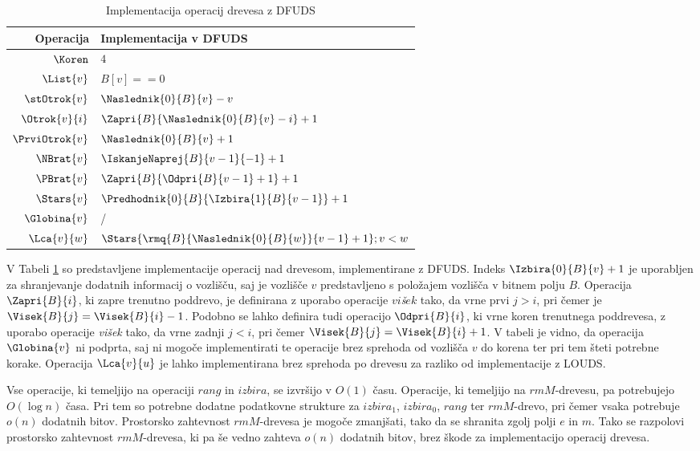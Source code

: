 \begin{table}[htb]
    \centering
    \caption{Implementacija operacij drevesa z DFUDS}
    \begin{tabular}{r|l}
\textbf{Operacija}& \textbf{Implementacija v DFUDS} \\\hline
         $\Koren$ &          $4$\\
         $\List{v}$ &        $B[v]==0$\\
         $\stOtrok{v}$&      $\Naslednik{0}{B}{v}-v$\\
         $\Otrok{v}{i}$ &    $\Zapri{B}{\Naslednik{0}{B}{v} - i}+1$\\
         $\PrviOtrok{v}$&     $\Naslednik{0}{B}{v}+1$\\
         $\NBrat{v}$ &       $\IskanjeNaprej{B}{v-1}{-1}+1$ \\
         $\PBrat{v}$ &       $\Zapri{B}{\Odpri{B}{v-1}+1}+1$ \\
         $\Stars{v}$ &        $\Predhodnik{0}{B}{\Izbira{1}{B}{v-1}}+1$ \\
         $\Globina{v}$ &         / \\
         $\Lca{v}{w}$ &      $\Stars{\rmq{B}{\Naslednik{0}{B}{w}}{v-1}+1};v<w$\\

    \end{tabular}
    \label{tab:DFUDSop}
\end{table}

V Tabeli \ref{tab:DFUDSop} so predstavljene implementacije operacij nad drevesom, implementirane z DFUDS. Indeks $\Izbira{0}{B}{v}+1$ je uporabljen za shranjevanje dodatnih informacij o vozlišču, saj je vozlišče $v$ predstavljeno s položajem vozlišča v bitnem polju $B$. Operacija $\Zapri{B}{i}$, ki zapre trenutno poddrevo, je definirana z uporabo operacije $vi$\textit{š}$ek$ tako, da vrne prvi $j>i$, pri čemer je $\Visek{B}{j}=\Visek{B}{i}-1$. Podobno se lahko definira tudi operacijo $\Odpri{B}{i}$, ki vrne koren trenutnega poddrevesa, z uporabo operacije \textit{višek} tako, da vrne zadnji $j<i$, pri čemer $\Visek{B}{j}=\Visek{B}{i}+1$. V tabeli je vidno, da operacija $\Globina{v}$ ni podprta, saj ni mogoče implementirati te operacije brez sprehoda od vozlišča $v$ do korena ter pri tem šteti potrebne korake. Operacija $\Lca{v}{u}$ je lahko implementirana brez sprehoda po drevesu za razliko od implementacije z LOUDS.

Vse operacije, ki temeljijo na operaciji $rang$ in $izbira$, se izvršijo v $O(1)$ času. Operacije, ki temeljijo na $rmM$-drevesu, pa potrebujejo $O(\log{n})$ časa. Pri tem so potrebne dodatne podatkovne strukture za $izbira_1$, $izbira_0$, $rang$ ter $rmM$-drevo, pri čemer vsaka potrebuje $o(n)$ dodatnih bitov. Prostorsko zahtevnost $rmM$-drevesa je mogoče zmanjšati, tako da se shranita zgolj polji $e$ in $m$. Tako se razpolovi prostorsko zahtevnost $rmM$-drevesa, ki pa še vedno zahteva $o(n)$ dodatnih bitov, brez škode za implementacijo operacij drevesa.

